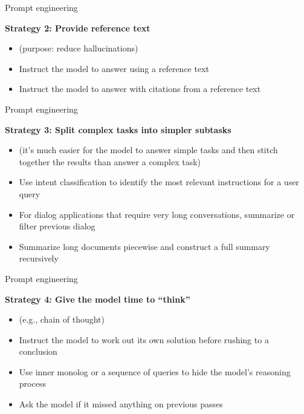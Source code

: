 \begin{vbframe}{Prompt engineering}

\vfill

\textbf{Strategy 2: Provide reference text}


\begin{itemize}
\item (purpose: reduce hallucinations)
\item     Instruct the model to answer using a reference text
\item         Instruct the model to answer with citations from a
        reference text

\end{itemize}

\vfill

\end{vbframe}
\begin{vbframe}{Prompt engineering}

\vfill

\textbf{Strategy 3: Split complex tasks into simpler subtasks}


\begin{itemize}

\item (it's much easier for the model to answer simple tasks
and then stitch together the results than answer a  complex task)
\item     Use intent classification to identify the most relevant
    instructions for a user query
\item         For dialog applications that require very long
    conversations, summarize or filter previous dialog
\item         Summarize long documents piecewise and construct a
    full summary recursively

\end{itemize}

\vfill

\end{vbframe}
\begin{vbframe}{Prompt engineering}

\vfill

\textbf{Strategy 4: Give the model time to ``think''}


\begin{itemize}

\item (e.g., chain of thought)
\item     Instruct the model to work out its own solution before
    rushing to a conclusion
\item         Use inner monolog or a sequence of queries to hide
    the model's reasoning process
\item         Ask the model if it missed anything on previous passes

\end{itemize}

\vfill

\end{vbframe}


